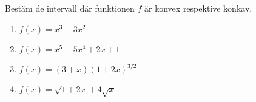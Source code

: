 


Bestäm de intervall där funktionen $f$ är konvex respektive konkav.
\begin{enumerate}
\item $ f(x) =  x^3-3x^2 $
\item $ f(x) =  x^5-5x^4+2x+1 $
\item $ f(x) =  (3+x)(1+2x)^{3/2} $
\item $ f(x) =  \sqrt{1+2x}+4\sqrt{x} $
\end{enumerate}
